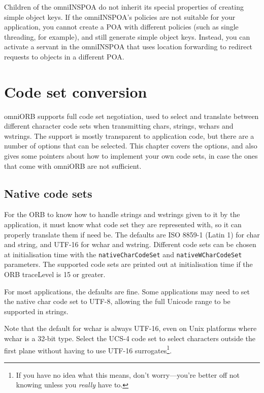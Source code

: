 \documentclass[11pt,oneside,a4paper]{book}
\newcommand{\code}[1]{\texttt{#1}}
\begin{document}
Children of the omniINSPOA do not inherit its special properties of
creating simple object keys. If the omniINSPOA's policies are not
suitable for your application, you cannot create a POA with different
policies (such as single threading, for example), and still generate
simple object keys. Instead, you can activate a servant in the
omniINSPOA that uses location forwarding to redirect requests to
objects in a different POA.





\chapter{Code set conversion}
\label{chap:codesets}

omniORB supports full code set negotiation, used to select and
translate between different character code sets when transmitting
chars, strings, wchars and wstrings. The support is mostly transparent
to application code, but there are a number of options that can be
selected. This chapter covers the options, and also gives some
pointers about how to implement your own code sets, in case the ones
that come with omniORB are not sufficient.


\section{Native code sets}

For the ORB to know how to handle strings and wstrings given to it by
the application, it must know what code set they are represented
with, so it can properly translate them if need be. The defaults are
ISO 8859-1 (Latin 1) for char and string, and UTF-16 for wchar and
wstring. Different code sets can be chosen at initialisation time with
the \code{nativeCharCodeSet} and \code{nativeWCharCodeSet}
parameters. The supported code sets are printed out at initialisation
time if the ORB traceLevel is 15 or greater.

For most applications, the defaults are fine. Some applications may
need to set the native char code set to UTF-8, allowing the full
Unicode range to be supported in strings.

Note that the default for wchar is always UTF-16, even on Unix
platforms where wchar is a 32-bit type. Select the UCS-4 code set to
select characters outside the first plane without having to use UTF-16
surrogates\footnote{If you have no idea what this means, don't
worry---you're better off not knowing unless you \emph{really} have
to.}.
\end{document}
